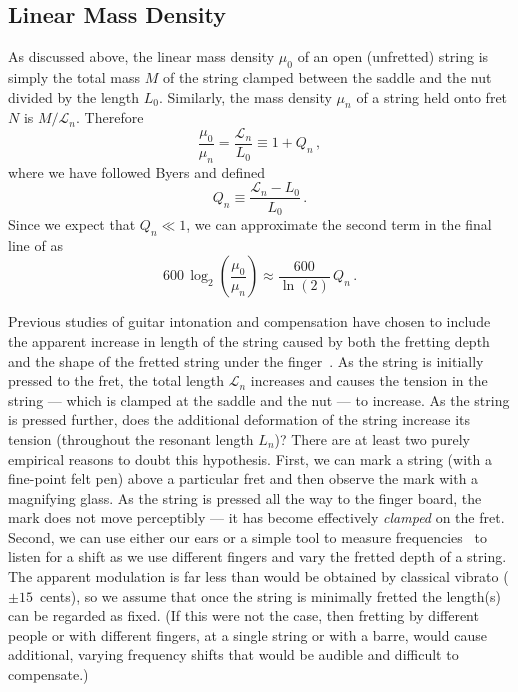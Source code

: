  \subsection{Linear Mass Density}
As discussed above, the linear mass density $\mu_0$ of an open (unfretted) string is simply the total mass $M$ of the string clamped between the saddle and the nut divided by the length $L_0$. Similarly, the mass density $\mu_n$ of a string held onto fret $N$ is $M/\mathcal{L}_n$. Therefore
 \begin{equation}
\frac{\mu_0}{\mu_n} = \frac{\mathcal{L}_n}{L_0} \equiv 1 + Q_n\, ,
 \end{equation}
where we have followed Byers and defined~\cite{ref:byers1996cgi,ref:varieschi2010icf}
 \begin{equation} \label{eqn:lambda_n_def}
Q_n \equiv \frac{\mathcal{L}_n - L_0}{L_0}\, .
 \end{equation}
Since we expect that $Q_n \ll 1$, we can approximate the second term in the final line of  as
 \begin{equation} \label{eqn:lmd_error}
600\, \log_2 \left(  \frac{\mu_0}{\mu_n} \right) \approx \frac{600}{\ln(2)}\, Q_n\, .
 \end{equation}

Previous studies of guitar intonation and compensation have chosen to include the apparent increase in length of the string caused by both the fretting depth and the shape of the fretted string under the finger~\cite{ref:byers1996cgi,ref:varieschi2010icf}. As the string is initially pressed to the fret, the total length $\mathcal{L}_n$ increases and causes the tension in the string --- which is clamped at the saddle and the nut --- to increase. As the string is pressed further, does the additional deformation of the string increase its tension (throughout the resonant length $L_n$)? There are at least two purely empirical reasons to doubt this hypothesis. First, we can mark a string (with a fine-point felt pen) above a particular fret and then observe the mark with a magnifying glass. As the string is pressed all the way to the finger board, the mark does not move perceptibly --- it has become effectively \emph{clamped} on the fret. Second, we can use either our ears or a simple tool to measure frequencies~\cite{ref:pgtweb} to listen for a shift as we use different fingers and vary the fretted depth of a string. The apparent modulation is far less than would be obtained by classical vibrato ($\pm15$~cents), so we assume that once the string is minimally fretted the length(s) can be regarded as fixed. (If this were not the case, then fretting by different people or with different fingers, at a single string or with a barre, would cause additional, varying frequency shifts that would be audible and difficult to compensate.)

